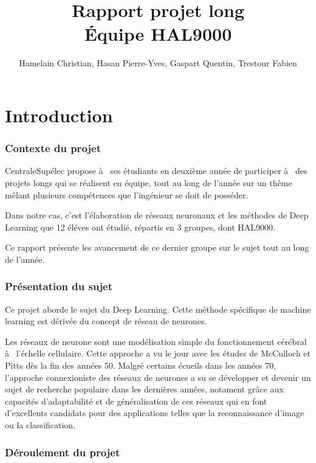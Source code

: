 \documentclass[a4paper,twoside]{report}
\title{Rapport projet long\\Équipe HAL9000}
\author{Hamelain Christian, Hasan Pierre-Yves, Gaspart Quentin, Trestour Fabien}
\begin{document}
    \setcounter{tocdepth}{1}


    \maketitle


    \tableofcontents


    \part{Introduction}

        \section[Contexte]{Contexte du projet}

            CentraleSupélec propose à  ses étudiants en deuxième année de participer
            à  des projets longs qui se réalisent en équipe, tout au long de l'année sur un thême mêlant plusieurs compétences que l'ingénieur se doit de posséder.

            Dans notre cas, c'est l'élaboration de réseaux neuronaux et les méthodes de Deep Learning que 12 éléves ont étudié, répartis en 3 groupes, dont HAL9000.

            Ce rapport présente les avancement de ce dernier groupe sur le sujet tout au long de l'année.


        \section{Présentation du sujet}

            Ce projet aborde le sujet du Deep Learning. Cette méthode spécifique de machine learning est dérivée du concept de réseau de neurones.

            Les réseaux de neurone sont une modélisation simple du fonctionnement cérébral
            à  l'échelle cellulaire. Cette approche a vu le jour avec les études de McCulloch et Pitts dès la fin des années 50. Malgré certains écueils dans les années 70, l'approche connexioniste des réseaux de neurones a su se développer et devenir un sujet de recherche populaire dans les dernières années, notament grâce aux capacités d'adaptabilité et de généralisation de ces réseaux qui en font d'excellents candidats pour des applications telles que la reconnaissance d'image ou la classification.


        \section[Déroulement]{Déroulement du projet}
\end{document}
